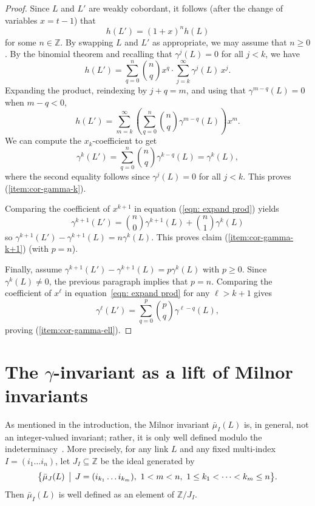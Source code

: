 \documentclass[a4paper, 11pt]{amsart}
\theoremstyle{definition}
\newcommand{\Z}{\mathbb{Z}}
\newcommand{\Sum}{\displaystyle \sum}
\newcommand{\pref}[1]{(\ref{#1})}
\newcommand{\noteta}{h}
\begin{document}
\begin{proof}
Since $L$ and $L'$ are weakly cobordant, it follows (after the change of variables $x=t-1$) that
$$
\noteta(L')=(1+x)^n\noteta(L)
$$
for some $n\in \Z$. By swapping $L$ and $L'$ as appropriate, we may assume that $n\ge 0$. By the binomial theorem and recalling that $\gamma^j(L)=0$ for all $j<k$, we have
$$\noteta(L')=\Sum_{q=0}^n {n\choose q}x^q\cdot \Sum_{j=k}^\infty \gamma^j(L)\,x^j.$$
Expanding the product, reindexing by $j+q=m$, and using that $\gamma^{m-q}(L)=0$ when $m-q<0$, 
\begin{equation}\label{eqn: expand prod}
\noteta(L')
=
\Sum_{m=k}^\infty
\left(\Sum_{q=0}^{n}{n\choose q}\gamma^{m-q}(L)\right)x^m.
\end{equation}
We can compute the $x_k$-coefficient to get
$$
\gamma^k(L')=\Sum_{q=0}^{n}{n\choose q}\gamma^{k-q}(L)=\gamma^k(L),
$$
where the second equality follows since $\gamma^j(L)=0$ for all $j<k$.  This proves \pref{item:cor-gamma-k}.

Comparing the coefficient of $x^{k+1}$ in equation \pref{eqn: expand prod} yields
$$
\gamma^{k+1}(L')={n\choose 0}\gamma^{k+1}(L)+{n\choose 1}\gamma^{k}(L)
$$
so $\gamma^{k+1}(L')-\gamma^{k+1}(L)=n \gamma^k(L)$. This proves claim \pref{item:cor-gamma-k+1} (with $p=n$).

Finally, assume $\gamma^{k+1}(L')-\gamma^{k+1}(L)=p \gamma^k(L)$ with $p\ge 0$. Since $\gamma^k(L)\neq 0$, the previous paragraph implies that $p=n$. Comparing the coefficient of $x^\ell$ in equation~\eqref{eqn: expand prod} for any $\ell>k+1$ gives
$$
\gamma^\ell(L')=\Sum_{q=0}^{p}{p\choose q}\gamma^{\ell-q}(L),
$$
proving \pref{item:cor-gamma-ell}.
\end{proof}


\section{The $\gamma$-invariant as a lift of Milnor invariants}\label{sect: lift of Milnor}


As mentioned in the introduction, the Milnor invariant $\bar{\mu}_I(L)$ is, in general, not an integer-valued invariant; rather, it is only well defined modulo the indeterminacy~\cite{M2}. More precisely, for any link $L$ and any fixed multi-index $I=(i_1 \dots i_n)$, let $J_I\subseteq \Z$ be the ideal generated by
\[
\bigl\{\bar{\mu}_J(L)\,\bigm|\,
J=(i_{k_1}\dots i_{k_m}),\ 1< m<n,\ 1\le k_1<\cdots<k_m\le n\bigr\}.
\]
Then $\bar{\mu}_I(L)$ is well defined as an element of $\Z/J_I$. 
\end{document}
